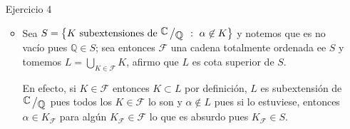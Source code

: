 \documentclass[11pt]{article}
\newcommand{\F}{\mathcal{F}}
\newcommand{\C}{\mathbb{C}}
\newcommand{\Q}{\mathbb{Q}}
\newcommand\tq{~:~}
\newcommand{\abs}[1]{\left\lvert#1\right\rvert}
\newcommand{\sett}[1]{\left\lbrace#1\right\rbrace}
\newcommand{\Bigcup}[2]{\bigcup\limits_{#1}{#2}}
\newcommand{\quotient}[2]{{\raisebox{.2em}{$#1$}\left/\raisebox{-.2em}{$#2$}\right.}}
\newtheorem{theorem}{Teorema}
\numberwithin{theorem}{subsection}
\newcommand{\qed}{\nobreak \ifvmode \relax \else
	\ifdim\lastskip<1.5em \hskip-\lastskip
	\hskip1.5em plus0em minus0.5em \fi \nobreak
	\vrule height0.75em width0.5em depth0.25em\fi}
\begin{document}
\begin{enumerate}
\begin{itemize}
		\textcolor{blue}{
		Ya vimos entonces que $\Q[\sqrt[p]{5}] \not \subset \Q[\xi]$, supongamos que existe $\Q \subsetneq E = \Q[\sqrt[p]{5}] \cap \Q[\xi]$, luego tenemos la torre de subextensiones $\Q \subsetneq E \subset \Q[\sqrt[p]{5}]$ y por grados:
		\begin{equation*}
			p = \left[\Q[\sqrt[p]{5}] : \Q\right] = \left[\Q[\sqrt[p]{5}] : E\right] \left[E:\Q\right]
		\end{equation*}
		Como $p$ es primo entonces concluimos que o $E = \Q[\sqrt[p]{5}]$ o $E=\Q$, pero ya vimos que $E \neq  \Q[\sqrt[p]{5}]$ pues la extension $\quotient{ \Q[\sqrt[p]{5}]}{\Q}$ no es normal; concluimos que $\Q[\sqrt[p]{5}] \cap \Q[\xi] = \Q$.}
		\textcolor{red}{ Recordemos el siguiente teorema:
		\begin{theorem}
				Sean $E,L$ extensiones de $F = E \cap L$ tal que $\quotient{E}{F}$ es Galois, luego $\quotient{EL}{L}$ es Galois y adem\'as $Gal(\quotient{EL}{L}) \simeq Gal(\quotient{E}{F})$
		\end{theorem}
		Luego entonces como $\quotient{Q[\xi]}{\Q}$ es Galois y $\Q[\sqrt[p]{5}] \cap \Q[\xi] = \Q$, usando el teorema sabemos que $\quotient{\Q[\xi, \sqrt[p]{5}]}{\Q[\sqrt[p]{5}]}$ es Galois y que $\varphi(n) = \abs{Gal(\quotient{Q[\xi]}{\Q})} = \abs{Gal(\quotient{\Q[\xi, \sqrt[p]{5}]}{\Q[\sqrt[p]{5}]})} = [\Q[\sqrt[p]{5}, \xi_n]:\Q[\sqrt[p]{5}]]$ pues adem\'as es Galois.
	}
		
		Luego, $[\Q[\sqrt[p]{5}, \xi_n]:\Q[\sqrt[p]{5}]] = \varphi(n)$ para este caso tambi\'en y entonces conclu\'imos que $\Phi_n$ resulta irreducible en $Q[\sqrt[p]{5}]$ para todo $p>2$.\qed 
		
	\end{itemize}
	
	\item[Ejercicio 4]
	
	\begin{itemize}
		\item Sea $S = \sett{K \text{ subextensiones de } \quotient{\C}{\Q} \tq \alpha \not \in K}$ y notemos que es no vac\'io pues $\Q \in S$; sea entonces $\F$ una cadena totalmente ordenada ee $S$ y tomemos $L = \Bigcup{K \in \F}{K}$, afirmo que $L$ es cota superior de $S$.
		
		En efecto, si $K \in \F$ entonces $K \subset L$ por definici\'on, $L$ es subextensi\'on de $\quotient{\C}{\Q}$ pues todos los $K \in \F$ lo son y $\alpha \not \in L$ pues si lo estuviese, entonces $\alpha \in K_{\F}$ para alg\'un $K_{\F} \in \F$ lo que es absurdo pues $K_{\F} \in S$.
	

\end{itemize}
\end{enumerate}
\end{document}

